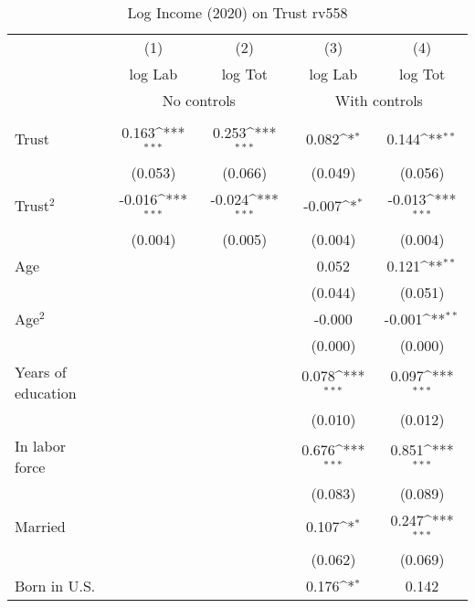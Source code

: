 \begin{table}[htbp]\centering
\def\sym#1{\ifmmode^{#1}\else\(^{#1}\)\fi}
\caption{Log Income (2020) on Trust rv558}
\begin{tabular}{l*{4}{c}}
\toprule
          &\multicolumn{1}{c}{(1)}&\multicolumn{1}{c}{(2)}&\multicolumn{1}{c}{(3)}&\multicolumn{1}{c}{(4)}\\
          &\multicolumn{1}{c}{log Lab}&\multicolumn{1}{c}{log Tot}&\multicolumn{1}{c}{log Lab}&\multicolumn{1}{c}{log Tot}\\
& \multicolumn{2}{c}{No controls} & \multicolumn{2}{c}{With controls} \\\\ \cmidrule(lr){2-3}\cmidrule(lr){4-5}
Trust     &    0.163\sym{***}&    0.253\sym{***}&    0.082\sym{*}  &    0.144\sym{**} \\
          &  (0.053)         &  (0.066)         &  (0.049)         &  (0.056)         \\
Trust$^{2}$&   -0.016\sym{***}&   -0.024\sym{***}&   -0.007\sym{*}  &   -0.013\sym{***}\\
          &  (0.004)         &  (0.005)         &  (0.004)         &  (0.004)         \\
Age       &                  &                  &    0.052         &    0.121\sym{**} \\
          &                  &                  &  (0.044)         &  (0.051)         \\
Age$^{2}$ &                  &                  &   -0.000         &   -0.001\sym{**} \\
          &                  &                  &  (0.000)         &  (0.000)         \\
Years of education&                  &                  &    0.078\sym{***}&    0.097\sym{***}\\
          &                  &                  &  (0.010)         &  (0.012)         \\
In labor force&                  &                  &    0.676\sym{***}&    0.851\sym{***}\\
          &                  &                  &  (0.083)         &  (0.089)         \\
Married   &                  &                  &    0.107\sym{*}  &    0.247\sym{***}\\
          &                  &                  &  (0.062)         &  (0.069)         \\
Born in U.S.&                  &                  &    0.176\sym{*}  &    0.142         \\

\end{tabular}
\end{table}
